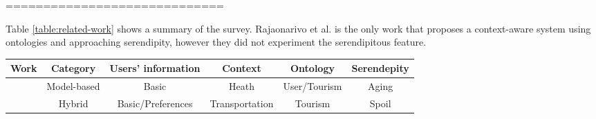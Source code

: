 =============================

Table \ref{table:related-work} shows a summary of the survey. Rajaonarivo et al. \cite{rajaonarivo2019rec} is the only work that proposes a context-aware system using ontologies and approaching serendipity, however they did not experiment the serendipitous feature.


\begin{table*}[h!]
    \centering
    \caption{Related work on recommender systems for e-tourism}
    \label{table:related-work}
    \begin{tabular}{|c|c|c|c|c|c|} 
        \hline
        \textbf{Work} & \textbf{Category} & \textbf{Users' information} & \textbf{Context}&\textbf{Ontology}&\textbf{Serendepity} \\\hline \hline 
        & Model-based  & Basic& Heath & User/Tourism & Aging\\    \hline
                &Hybrid &Basic/Preferences & Transportation& Tourism & Spoil \\    \hline
    \end{tabular}
    
    \end{table*}


